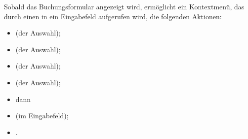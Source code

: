 	Sobald das Buchungsformular angezeigt wird, ermöglicht ein Kontextmenü, das durch einen  in ein Eingabefeld aufgerufen wird, die folgenden Aktionen:
	
	\begin{itemize}
	\item {} (der Auswahl);
	\item {} (der Auswahl);
	\item {} (der Auswahl);
	\item {} (der Auswahl);
	\item[]\hspace{-12pt} dann
	\item {} (im Eingabefeld);
	\item {}.
	\end{itemize}
	
